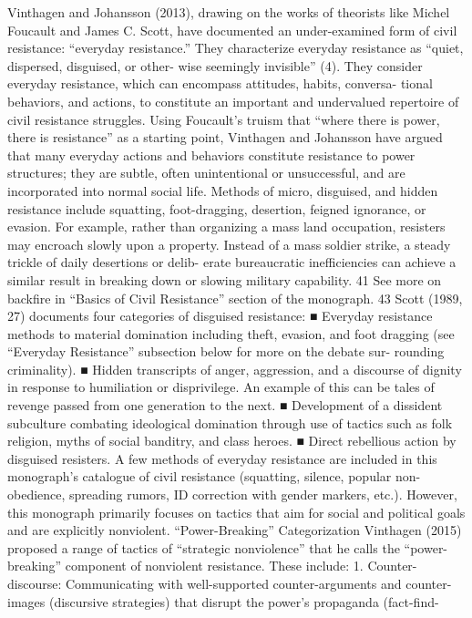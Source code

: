 \documentclass[twoside,a4paper,12pt,fleqn,openany]{extbook}
\begin{document}
Vinthagen and Johansson (2013), drawing on the works of theorists like Michel Foucault and
James C. Scott, have documented an under-examined form of civil resistance: “everyday
resistance.” They characterize everyday resistance as “quiet, dispersed, disguised, or other-
wise seemingly invisible” (4).
They consider everyday resistance, which can encompass attitudes, habits, conversa-
tional behaviors, and actions, to constitute an important and undervalued repertoire of civil
resistance struggles. Using Foucault’s truism that “where there is power, there is resistance”
as a starting point, Vinthagen and Johansson have argued that many everyday actions and
behaviors constitute resistance to power structures; they are subtle, often unintentional or
unsuccessful, and are incorporated into normal social life. Methods of micro, disguised, and
hidden resistance include squatting, foot-dragging, desertion, feigned ignorance, or evasion.
For example, rather than organizing a mass land occupation, resisters may encroach slowly
upon a property. Instead of a mass soldier strike, a steady trickle of daily desertions or delib-
erate bureaucratic inefficiencies can achieve a similar result in breaking down or slowing
military capability.
41
 See more on backfire in “Basics of Civil Resistance” section of the monograph.
43
Scott (1989, 27) documents four categories of disguised resistance:
■
Everyday resistance methods to material domination including theft, evasion, and foot
dragging (see “Everyday Resistance” subsection below for more on the debate sur-
rounding criminality).
■
 Hidden transcripts of anger, aggression, and a discourse of dignity in response to
humiliation or disprivilege. An example of this can be tales of revenge passed from
one generation to the next.
■
Development of a dissident subculture combating ideological domination through use
of tactics such as folk religion, myths of social banditry, and class heroes.
■
 Direct rebellious action by disguised resisters.
A few methods of everyday resistance are included in this monograph’s catalogue of
civil resistance (squatting, silence, popular non-obedience, spreading rumors, ID correction
with gender markers, etc.). However, this monograph primarily focuses on tactics that aim for
social and political goals and are explicitly nonviolent.
“Power-Breaking” Categorization
Vinthagen (2015) proposed a range of tactics of “strategic nonviolence” that he calls the
“power-breaking” component of nonviolent resistance.
These include:
1.	Counter-discourse: Communicating with well-supported counter-arguments and
counter-images (discursive strategies) that disrupt the power’s propaganda (fact-find-
\end{document}
